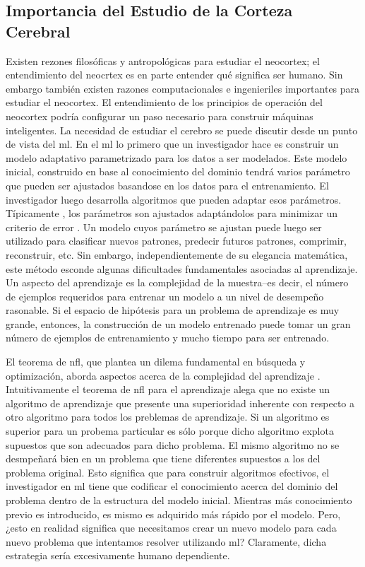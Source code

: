 \subsection{Importancia del Estudio de la Corteza Cerebral}

Existen rezones filosóficas y antropológicas para estudiar el neocortex; el entendimiento del neocrtex es en parte
entender qué significa ser humano.
Sin embargo también existen razones computacionales e ingenieriles importantes para estudiar el neocortex.
El entendimiento de los principios de operación del neocortex podría configurar un paso necesario para construir máquinas inteligentes.
La necesidad de estudiar el cerebro se puede discutir desde un punto de vista del \gls{ml}.
En el \gls{ml} lo primero que un investigador hace es construir un modelo adaptativo parametrizado para los datos a ser modelados.
Este modelo inicial, construido en base al conocimiento del dominio tendrá varios parámetro que pueden ser ajustados basandose en los datos para el entrenamiento.
El investigador luego desarrolla algoritmos que pueden adaptar esos parámetros.
Típicamente , los parámetros son ajustados adaptándolos para minimizar un criterio de error \cite{bishop2007,dudaHart1973}.
Un modelo cuyos parámetro se ajustan puede luego ser utilizado para clasificar nuevos patrones,
predecir futuros patrones, comprimir, reconstruir, etc.
Sin embargo, independientemente de su elegancia matemática, este método esconde algunas dificultades fundamentales asociadas al aprendizaje.
Un aspecto del aprendizaje es la complejidad de la muestra--es decir, el número de ejemplos requeridos para entrenar un modelo
a un nivel de desempeño rasonable.
Si el espacio de hipótesis para un problema de aprendizaje es muy grande,
entonces, la construcción de un modelo entrenado puede tomar un gran número de ejemplos de entrenamiento
y mucho tiempo para ser entrenado.

El teorema de \gls{nfl}, que plantea un dilema fundamental en búsqueda y optimización,
aborda aspectos acerca de la complejidad del aprendizaje \cite{RePEc:eee:renene:v:134:y:2019:i:c:p:1295-1306}.
Intuitivamente el teorema de \gls{nfl} para el aprendizaje alega que 
no existe un algoritmo de aprendizaje que presente una superioridad inherente con respecto a otro algoritmo
para todos los preblemas de aprendizaje.
Si un algoritmo es superior para un probema particular es sólo porque dicho algoritmo explota
supuestos que son adecuados para dicho problema.
El mismo algoritmo no se desmpeñará bien en un problema que tiene diferentes supuestos
a los del problema original.
Esto significa que para construir algoritmos efectivos, el investigador en \gls{ml}
tiene que codificar el conocimiento acerca del dominio del problema dentro de la estructura del modelo inicial.
Mientras más conocimiento previo es introducido, es mismo es adquirido más rápido por el modelo.
Pero, ¿esto en realidad significa que necesitamos crear un nuevo modelo para cada nuevo problema
que intentamos resolver utilizando \gls{ml}?
Claramente, dicha estrategia sería excesivamente humano dependiente.

